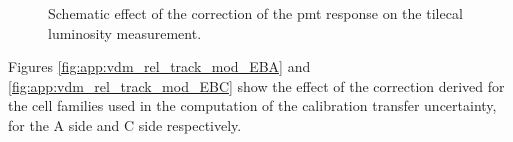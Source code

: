 \begin{figure}[htbp]
\centering
{}
\caption{Schematic effect of the correction of the \gls{pmt} response on the \gls{tilecal} luminosity measurement.}
\label{fig:apppmt:sketch}
\end{figure}


Figures \ref{fig:app:vdm_rel_track_mod_EBA} and \ref{fig:app:vdm_rel_track_mod_EBC} 
show the effect of the correction derived for the cell families used in the computation of the 
calibration transfer uncertainty, for the A side and C side respectively. 



